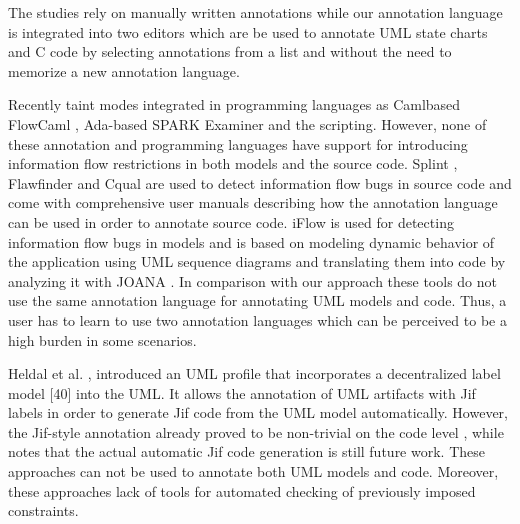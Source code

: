  The studies rely on manually
written annotations while our annotation language is integrated
into two editors which are be used to annotate UML state
charts and C code by selecting annotations from a list and
without the need to memorize a new annotation language.

Recently taint modes integrated in programming languages as Camlbased FlowCaml \cite{ref_32_simonet:report}, Ada-based SPARK Examiner \cite{ref_31_chapman:enforcing} and the scripting. However, none of these annotation and programming languages have support for introducing information flow
restrictions in both models and the source code.
Splint \cite{ref_30_david:splint}, Flawfinder \cite{ref_29_wheeler:flawfinder} and Cqual \cite{ref_28_umesh:cqual} are used to
detect information flow bugs in source code and come with
comprehensive user manuals describing how the annotation
language can be used in order to annotate source code.
iFlow \cite{ref_27_iflow:kuzman} is used for detecting information flow bugs in
models and is based on modeling dynamic behavior of the
application using UML sequence diagrams and translating
them into code by analyzing it with JOANA \cite{ref_26_kit:joana}. In comparison with our approach these tools do not use the same
annotation language for annotating UML models and code.
Thus, a user has to learn to use two annotation languages
which can be perceived to be a high burden in some scenarios.


 Heldal et al. \cite{ref_25_heldal:bridging}, \cite{ref_23_heldal:supporting} introduced an
UML profile that incorporates a decentralized label model [40]
into the UML. It allows the annotation of UML artifacts with
Jif \cite{ref_24_myers:descentrelized} labels in order to generate Jif code from the UML
model automatically. However, the Jif-style annotation already
proved to be non-trivial on the code level \cite{ref_22_preibusch2011information}, while \cite{ref_23_heldal:supporting}
notes that the actual automatic Jif code generation is still future
work. These approaches can not be used to annotate both UML
models and code. Moreover, these approaches lack of tools for
automated checking of previously imposed constraints.